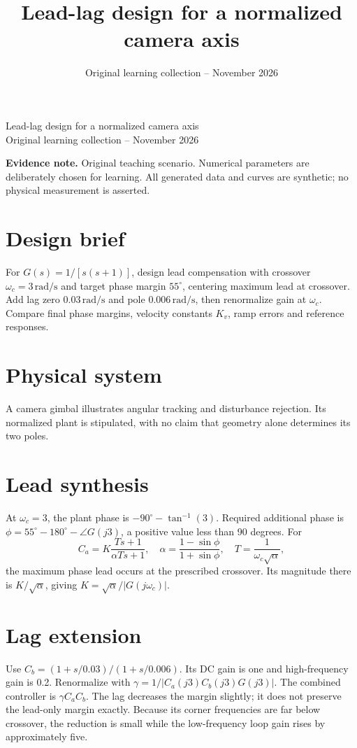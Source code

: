 \documentclass[10pt,a4paper]{article}
\title{\color{ink}Lead-lag design for a normalized camera axis}
\author{}
\date{Original learning collection -- November 2026}
\begin{document}
\begin{center}{\LARGE\color{ink}Lead-lag design for a normalized camera axis}\\[5pt]{\small Original learning collection -- November 2026}\end{center}

\textbf{Evidence note.} Original teaching scenario. Numerical parameters are deliberately chosen for learning. All generated data and curves are synthetic; no physical measurement is asserted.
\section{Design brief}
For $G(s)=1/[s(s+1)]$, design lead compensation with crossover $\omega_c=3\,\mathrm{rad/s}$ and target phase margin $55^\circ$, centering maximum lead at crossover. Add lag zero $0.03\,\mathrm{rad/s}$ and pole $0.006\,\mathrm{rad/s}$, then renormalize gain at $\omega_c$. Compare final phase margins, velocity constants $K_v$, ramp errors and reference responses.
\section{Physical system}
\begin{center}\resizebox{.88\linewidth}{!}{}\par{\small A camera gimbal illustrates angular tracking and disturbance rejection. Its normalized plant is stipulated, with no claim that geometry alone determines its two poles.}\end{center}
\section{Lead synthesis}
At $\omega_c=3$, the plant phase is $-90^\circ-\tan^{-1}(3)$. Required additional phase is $\phi=55^\circ-180^\circ-\angle G(j3)$, a positive value less than 90 degrees. For
\[C_a=K\frac{Ts+1}{\alpha Ts+1},\quad \alpha=\frac{1-\sin\phi}{1+\sin\phi},\quad T=\frac1{\omega_c\sqrt\alpha},\]
the maximum phase lead occurs at the prescribed crossover. Its magnitude there is $K/\sqrt\alpha$, giving $K=\sqrt\alpha/|G(j\omega_c)|$.
\section{Lag extension}
Use $C_b=(1+s/0.03)/(1+s/0.006)$. Its DC gain is one and high-frequency gain is 0.2. Renormalize with $\gamma=1/|C_a(j3)C_b(j3)G(j3)|$. The combined controller is $\gamma C_aC_b$.
The lag decreases the margin slightly; it does not preserve the lead-only margin exactly. Because its corner frequencies are far below crossover, the reduction is small while the low-frequency loop gain rises by approximately five.
\end{document}
